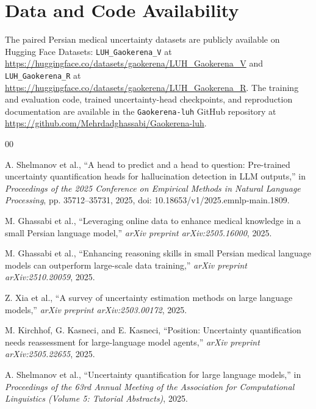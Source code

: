 \documentclass[conference,a4paper]{IEEEtran}
\begin{document}
\section*{Data and Code Availability}
The paired Persian medical uncertainty datasets are publicly available on Hugging Face Datasets: \texttt{LUH\_Gaokerena\_V} at \url{https://huggingface.co/datasets/gaokerena/LUH_Gaokerena_V} and \texttt{LUH\_Gaokerena\_R} at \url{https://huggingface.co/datasets/gaokerena/LUH_Gaokerena_R}. The training and evaluation code, trained uncertainty-head checkpoints, and reproduction documentation are available in the \texttt{Gaokerena-luh} GitHub repository at \url{https://github.com/Mehrdadghassabi/Gaokerena-luh}.

\begin{thebibliography}{00}


A. Shelmanov et al., ``A head to predict and a head to question: Pre-trained uncertainty quantification heads for hallucination detection in LLM outputs,'' in \emph{Proceedings of the 2025 Conference on Empirical Methods in Natural Language Processing}, pp. 35712--35731, 2025, doi: 10.18653/v1/2025.emnlp-main.1809.


M. Ghassabi et al., ``Leveraging online data to enhance medical knowledge in a small Persian language model,'' \emph{arXiv preprint arXiv:2505.16000}, 2025.


M. Ghassabi et al., ``Enhancing reasoning skills in small Persian medical language models can outperform large-scale data training,'' \emph{arXiv preprint arXiv:2510.20059}, 2025.


Z. Xia et al., ``A survey of uncertainty estimation methods on large language models,'' \emph{arXiv preprint arXiv:2503.00172}, 2025.


M. Kirchhof, G. Kasneci, and E. Kasneci, ``Position: Uncertainty quantification needs reassessment for large-language model agents,'' \emph{arXiv preprint arXiv:2505.22655}, 2025.


A. Shelmanov et al., ``Uncertainty quantification for large language models,'' in \emph{Proceedings of the 63rd Annual Meeting of the Association for Computational Linguistics (Volume 5: Tutorial Abstracts)}, 2025.


\end{thebibliography}
\end{document}
